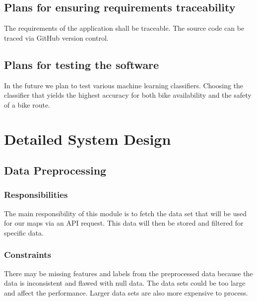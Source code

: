 \documentclass[a4paper,12pt]{article}
\begin{document}
\subsection{Plans for ensuring requirements traceability}
The requirements of the application shall be traceable. The source code can be traced via GitHub
version control.
\subsection{Plans for testing the software}
In the future we plan to test various machine learning classifiers. Choosing the classifier that
yields the highest accuracy for both bike availability and the safety of a bike route.
\section{Detailed System Design}
\subsection{Data Preprocessing}
    \subsubsection{Responsibilities}
        The main responsibility of this module is to fetch the data set that will be used for our maps via an API request. This data will then be stored and filtered for specific data.
    \subsubsection{Constraints}
        There may be missing features and labels from the preprocessed data because the data is inconsistent and flawed with null data. The data sets could be too large and affect the performance. Larger data sets are also more expensive to process.
\end{document}
